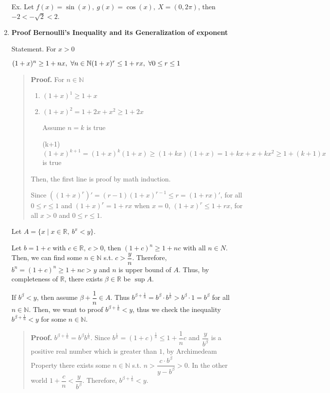 \documentclass[12pt]{article}
\begin{document}
\begin{enumerate}
    Ex. Let $f(x) = \sin(x),\ g(x) = \cos(x),\ X = (0, 2\pi)$, then $-2 < -\sqrt{2} < 2$.

    \newpage

    \item {\bf Proof Bernoulli's Inequality and its Generalization of exponent}
    
    Statement. For $x > 0$
    
    $(1+x)^n \geq 1+nx,\ \forall n\in \mathbb{N}\\
    (1+x)^r \leq 1+rx,\ \forall 0\leq r\leq 1$
    \begin{quote}
        {\bf Proof.} For $n\in \mathbb{N}$\begin{enumerate}[(1)]
            \item $(1+x)^1 \geq 1+x$
            \item $(1+x)^2 = 1 + 2x + x^2 \geq 1 + 2x$
            \item[] Assume $n = k$ is true
            \item[(k+1)] $(1+x)^{k+1} = (1+x)^k(1+x) \geq (1+kx)(1+x) = 1 + kx + x + kx^2 \geq 1 + (k+1)x$ is true
        \end{enumerate}
        Then, the first line is proof by math induction.

        Since $((1+x)^r)' = (r-1) (1+x)^{r-1} \leq r = (1+rx)'$, for all $0\leq r \leq 1$ and $(1+x)^r = 1+rx$ when $x = 0$,
        $(1+x)^r \leq 1+rx$, for all $x > 0$ and $0\leq r \leq 1$.
    \end{quote}
    
    Let $A = \lbrace x \mid x \in \mathbb{R},\ b^x < y\rbrace$.
    
    Let $b = 1+c$ with $c \in \mathbb{R},\ c > 0$, then $(1+c)^n \geq 1 + nc$ with all $n \in N$.
    Then, we can find some $n \in \mathbb{N}$ s.t. $c > \dfrac{y}{n}$. Therefore, $b^n = (1+c)^n \geq 1+nc > y$ and $n$ is upper bound of $A$. Thus, by completeness of $\mathbb{R}$, there exists $\beta \in \mathbb{R}$ be $\sup A$. 
    
    If $b^\beta < y$, then assume $\beta + \dfrac{1}{n} \in A$. Thus $b^{\beta + \frac{1}{n}} = b^\beta \cdot b^\frac{1}{n} > b^\beta \cdot 1 = b^\beta$ for all $n \in \mathbb{N}$.
    Then, we want to proof $b^{\beta + \frac{1}{n}} < y$, thus we check the inequality $b^{\beta + \frac{1}{n}} < y$ for some $n \in \mathbb{N}$.
    \begin{quote}
        {\bf Proof.} $b^{\beta + \frac{1}{n}} = b^\beta b^{\frac{1}{n}}$. 
        Since $b^{\frac{1}{n}} = (1+c)^\frac{1}{n} \leq 1 + \dfrac{1}{n} c$ and $\dfrac{y}{b^\beta}$ is a positive real number which is greater than $1$, 
        by Archimedeam Property there exists some $n \in \mathbb{N}$ s.t. $n > \dfrac{c\cdot b^\beta}{y-b^\beta} > 0$. In the other world $1 + \dfrac{c}{n} < \dfrac{y}{b^\beta}$.
        Therefore, $b^{\beta + \frac{1}{n}} < y$.
    \end{quote}
    

\end{enumerate}
\end{document}
